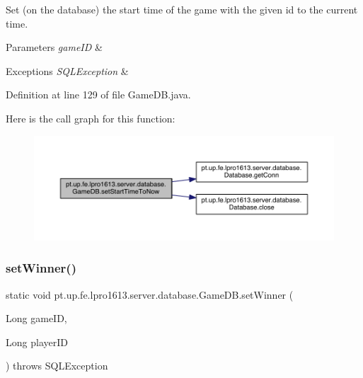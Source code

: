Set (on the database) the start time of the game with the given id to the current time.


\begin{DoxyParams}{Parameters}
{\em game\+ID} & \\
\hline
\end{DoxyParams}

\begin{DoxyExceptions}{Exceptions}
{\em S\+Q\+L\+Exception} & \\
\hline
\end{DoxyExceptions}


Definition at line 129 of file Game\+D\+B.\+java.

Here is the call graph for this function\+:
\nopagebreak
\begin{figure}[H]
\begin{center}
\leavevmode
\includegraphics[width=350pt]{classpt_1_1up_1_1fe_1_1lpro1613_1_1server_1_1database_1_1_game_d_b_a991c06b53598f46f4eea30c8c8fc31f7_cgraph}
\end{center}
\end{figure}
\hypertarget{classpt_1_1up_1_1fe_1_1lpro1613_1_1server_1_1database_1_1_game_d_b_a30f4664442da6b7ae80b1821aaa195fa}{}\label{classpt_1_1up_1_1fe_1_1lpro1613_1_1server_1_1database_1_1_game_d_b_a30f4664442da6b7ae80b1821aaa195fa} 
\subsubsection{\texorpdfstring{set\+Winner()}{setWinner()}}
{\footnotesize\ttfamily static void pt.\+up.\+fe.\+lpro1613.\+server.\+database.\+Game\+D\+B.\+set\+Winner (\begin{DoxyParamCaption}\item[{Long}]{game\+ID,  }\item[{Long}]{player\+ID }\end{DoxyParamCaption}) throws S\+Q\+L\+Exception\hspace{0.3cm}{\ttfamily [static]}}

